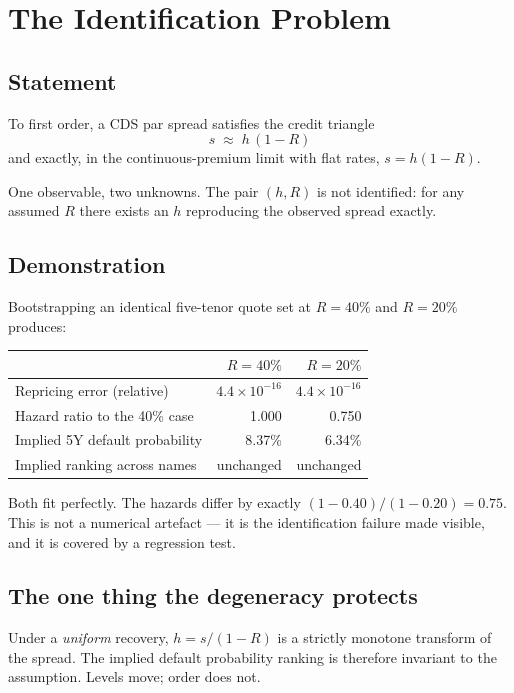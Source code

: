 \documentclass[11pt,a4paper]{article}
\begin{document}
\section{The Identification Problem}

\subsection{Statement}

To first order, a CDS par spread satisfies the credit triangle
\[
s \;\approx\; h\,(1-R)
\]
and exactly, in the continuous-premium limit with flat rates, $s = h(1-R)$.

One observable, two unknowns. The pair $(h, R)$ is not identified: for any assumed
$R$ there exists an $h$ reproducing the observed spread exactly.

\subsection{Demonstration}

Bootstrapping an identical five-tenor quote set at $R = 40\%$ and $R = 20\%$ produces:

\begin{center}
\begin{tabular}{lrr}
\toprule
& \textbf{$R = 40\%$} & \textbf{$R = 20\%$} \\
\midrule
Repricing error (relative) & $4.4\times10^{-16}$ & $4.4\times10^{-16}$ \\
Hazard ratio to the 40\% case & 1.000 & 0.750 \\
Implied 5Y default probability & 8.37\% & 6.34\% \\
Implied ranking across names & unchanged & unchanged \\
\bottomrule
\end{tabular}
\end{center}

Both fit perfectly. The hazards differ by exactly $(1-0.40)/(1-0.20) = 0.75$. This is
not a numerical artefact --- it is the identification failure made visible, and it is
covered by a regression test.

\subsection{The one thing the degeneracy protects}

Under a \emph{uniform} recovery, $h = s/(1-R)$ is a strictly monotone transform of the
spread. The implied default probability ranking is therefore invariant to the
assumption. Levels move; order does not.
\end{document}
